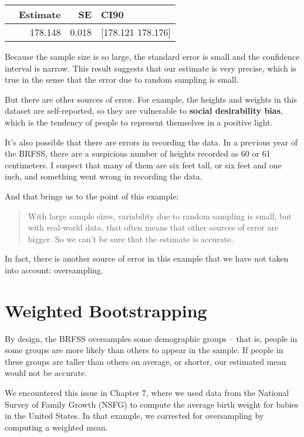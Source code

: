 \begin{tabular}{lrrl}
\toprule
 & Estimate & SE & CI90 \\
\midrule
 & 178.148 & 0.018 & [178.121 178.176] \\
\bottomrule
\end{tabular}

Because the sample size is so large, the standard error is small and the
confidence interval is narrow. This result suggests that our estimate is
very precise, which is true in the sense that the error due to random
sampling is small.

But there are other sources of error. For example, the heights and
weights in this dataset are self-reported, so they are vulnerable to
\textbf{social desirability bias}, which is the tendency of people to
represent themselves in a positive light.

It's also possible that there are errors in recording the data. In a
previous year of the BRFSS, there are a suspicious number of heights
recorded as 60 or 61 centimeters. I suspect that many of them are six
feet tall, or six feet and one inch, and something went wrong in
recording the data.

And that brings us to the point of this example:

\begin{quote}
With large sample sizes, variability due to random sampling is small,
but with real-world data, that often means that other sources of error
are bigger. So we can't be sure that the estimate is accurate.
\end{quote}

In fact, there is another source of error in this example that we have
not taken into account: oversampling.

\section{Weighted Bootstrapping}\label{weighted-bootstrapping}

By design, the BRFSS oversamples some demographic groups -- that is,
people in some groups are more likely than others to appear in the
sample. If people in these groups are taller than others on average, or
shorter, our estimated mean would not be accurate.

We encountered this issue in Chapter 7, where we used data from the
National Survey of Family Growth (NSFG) to compute the average birth
weight for babies in the United States. In that example, we corrected
for oversampling by computing a weighted mean.

